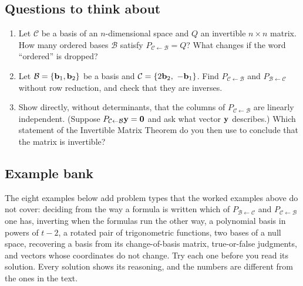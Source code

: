 \documentclass[11pt]{article}
\begin{document}
\subsection*{Questions to think about}
\begin{enumerate}
  \item Let $\mathcal{C}$ be a basis of an $n$-dimensional space and $Q$ an invertible $n\times n$ matrix. How many ordered bases $\mathcal{B}$ satisfy $P_{\mathcal{C}\leftarrow\mathcal{B}}=Q$? What changes if the word ``ordered'' is dropped?
  \item Let $\mathcal{B}=\{\mathbf{b}_1,\mathbf{b}_2\}$ be a basis and $\mathcal{C}=\{2\bv{b}_2,\ -\bv{b}_1\}$. Find $P_{\mathcal{C}\leftarrow\mathcal{B}}$ and $P_{\mathcal{B}\leftarrow\mathcal{C}}$ without row reduction, and check that they are inverses.
  \item Show directly, without determinants, that the columns of $P_{\mathcal{C}\leftarrow\mathcal{B}}$ are linearly independent. (Suppose $P_{\mathcal{C}\leftarrow\mathcal{B}}\mathbf{y}=\mathbf{0}$ and ask what vector $\mathbf{y}$ describes.) Which statement of the Invertible Matrix Theorem do you then use to conclude that the matrix is invertible?
\end{enumerate}

\subsection*{Example bank}
The eight examples below add problem types that the worked examples above do not cover: deciding from the way a formula is written which of $P_{\mathcal{B}\leftarrow\mathcal{C}}$ and $P_{\mathcal{C}\leftarrow\mathcal{B}}$ one has, inverting when the formulas run the other way, a polynomial basis in powers of $t-2$, a rotated pair of trigonometric functions, two bases of a null space, recovering a basis from its change-of-basis matrix, true-or-false judgments, and vectors whose coordinates do not change. Try each one before you read its solution. Every solution shows its reasoning, and the numbers are different from the ones in the text.
\end{document}
